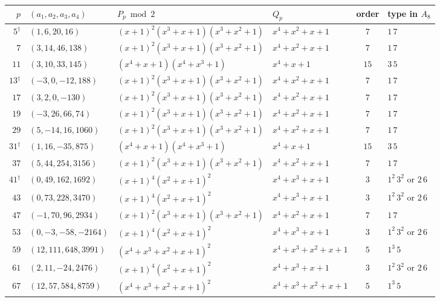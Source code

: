 \begin{table}[ht]
\centering\footnotesize
\begin{tabular}{@{}rlllcl@{}}
\toprule
$p$ & $(a_1,a_2,a_3,a_4)$ & $P_p \bmod 2$ & $Q_p$ & order & type in $A_8$\\
\midrule
$5$$^\dagger$ & $(1, 6, 20, 16)$ & $(x+1)^{2}(x^{3}+x+1)(x^{3}+x^{2}+1)$ & $x^{4}+x^{2}+x+1$ & $7$ & $1\,7$\\
$7$ & $(3, 14, 46, 138)$ & $(x+1)^{2}(x^{3}+x+1)(x^{3}+x^{2}+1)$ & $x^{4}+x^{2}+x+1$ & $7$ & $1\,7$\\
$11$ & $(3, 10, 33, 145)$ & $(x^{4}+x+1)(x^{4}+x^{3}+1)$ & $x^{4}+x+1$ & $15$ & $3\,5$\\
$13$$^\dagger$ & $(-3, 0, -12, 188)$ & $(x+1)^{2}(x^{3}+x+1)(x^{3}+x^{2}+1)$ & $x^{4}+x^{2}+x+1$ & $7$ & $1\,7$\\
$17$ & $(3, 2, 0, -130)$ & $(x+1)^{2}(x^{3}+x+1)(x^{3}+x^{2}+1)$ & $x^{4}+x^{2}+x+1$ & $7$ & $1\,7$\\
$19$ & $(-3, 26, 66, 74)$ & $(x+1)^{2}(x^{3}+x+1)(x^{3}+x^{2}+1)$ & $x^{4}+x^{2}+x+1$ & $7$ & $1\,7$\\
$29$ & $(5, -14, 16, 1060)$ & $(x+1)^{2}(x^{3}+x+1)(x^{3}+x^{2}+1)$ & $x^{4}+x^{2}+x+1$ & $7$ & $1\,7$\\
$31$$^\dagger$ & $(1, 16, -35, 875)$ & $(x^{4}+x+1)(x^{4}+x^{3}+1)$ & $x^{4}+x+1$ & $15$ & $3\,5$\\
$37$ & $(5, 44, 254, 3156)$ & $(x+1)^{2}(x^{3}+x+1)(x^{3}+x^{2}+1)$ & $x^{4}+x^{2}+x+1$ & $7$ & $1\,7$\\
$41$$^\dagger$ & $(0, 49, 162, 1692)$ & $(x+1)^{4}(x^{2}+x+1)^{2}$ & $x^{4}+x^{3}+x+1$ & $3$ & $1^{2}\,3^{2}$ or $2\,6$\\
$43$ & $(0, 73, 228, 3470)$ & $(x+1)^{4}(x^{2}+x+1)^{2}$ & $x^{4}+x^{3}+x+1$ & $3$ & $1^{2}\,3^{2}$ or $2\,6$\\
$47$ & $(-1, 70, 96, 2934)$ & $(x+1)^{2}(x^{3}+x+1)(x^{3}+x^{2}+1)$ & $x^{4}+x^{2}+x+1$ & $7$ & $1\,7$\\
$53$ & $(0, -3, -58, -2164)$ & $(x+1)^{4}(x^{2}+x+1)^{2}$ & $x^{4}+x^{3}+x+1$ & $3$ & $1^{2}\,3^{2}$ or $2\,6$\\
$59$ & $(12, 111, 648, 3991)$ & $(x^{4}+x^{3}+x^{2}+x+1)^{2}$ & $x^{4}+x^{3}+x^{2}+x+1$ & $5$ & $1^{3}\,5$\\
$61$ & $(2, 11, -24, 2476)$ & $(x+1)^{4}(x^{2}+x+1)^{2}$ & $x^{4}+x^{3}+x+1$ & $3$ & $1^{2}\,3^{2}$ or $2\,6$\\
$67$ & $(12, 57, 584, 8759)$ & $(x^{4}+x^{3}+x^{2}+x+1)^{2}$ & $x^{4}+x^{3}+x^{2}+x+1$ & $5$ & $1^{3}\,5$\\

\end{tabular}
\end{table}
